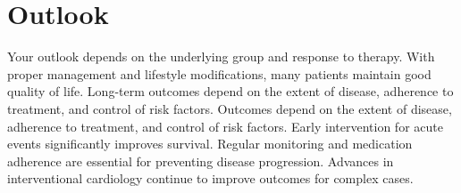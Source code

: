 \section{Outlook}
Your outlook depends on the underlying group and response to therapy. With proper management and lifestyle modifications, many patients maintain good quality of life. Long-term outcomes depend on the extent of disease, adherence to treatment, and control of risk factors. Outcomes depend on the extent of disease, adherence to treatment, and control of risk factors. Early intervention for acute events significantly improves survival. Regular monitoring and medication adherence are essential for preventing disease progression. Advances in interventional cardiology continue to improve outcomes for complex cases.
